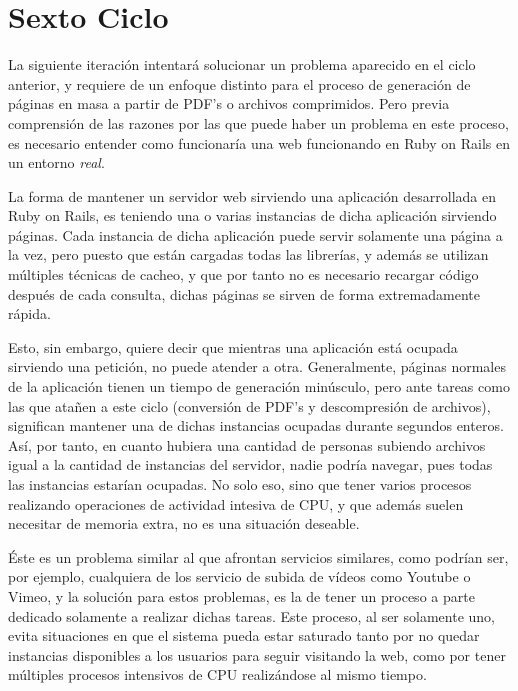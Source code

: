 \section{Sexto Ciclo} %
\label{sec:sexto_ciclo}

La siguiente iteración intentará solucionar un problema aparecido en el ciclo anterior, y requiere de un enfoque distinto para el proceso de generación de páginas en masa a partir de PDF's o archivos comprimidos. Pero previa comprensión de las razones por las que puede haber un problema en este proceso, es necesario entender como funcionaría una web funcionando en Ruby on Rails en un entorno \emph{real}.

La forma de mantener un servidor web sirviendo una aplicación desarrollada en Ruby on Rails, es teniendo una o varias instancias de dicha aplicación sirviendo páginas. Cada instancia de dicha aplicación puede servir solamente una página a la vez, pero puesto que están cargadas todas las librerías, y además se utilizan múltiples técnicas de cacheo, y que por tanto no es necesario recargar código después de cada consulta, dichas páginas se sirven de forma extremadamente rápida.

Esto, sin embargo, quiere decir que mientras una aplicación está ocupada sirviendo una petición, no puede atender a otra. Generalmente, páginas normales de la aplicación tienen un tiempo de generación minúsculo, pero ante tareas como las que atañen a este ciclo (conversión de PDF's y descompresión de archivos), significan mantener una de dichas instancias ocupadas durante segundos enteros. Así, por tanto, en cuanto hubiera una cantidad de personas subiendo archivos igual a la cantidad de instancias del servidor, nadie podría navegar, pues todas las instancias estarían ocupadas. No solo eso, sino que tener varios procesos realizando operaciones de actividad intesiva de CPU, y que además suelen necesitar de memoria extra, no es una situación deseable.

Éste es un problema similar al que afrontan servicios similares, como podrían ser, por ejemplo, cualquiera de los servicio de subida de vídeos como Youtube o Vimeo, y la solución para estos problemas, es la de tener un proceso a parte dedicado solamente a realizar dichas tareas. Este proceso, al ser solamente uno, evita situaciones en que el sistema pueda estar saturado tanto por no quedar instancias disponibles a los usuarios para seguir visitando la web, como por tener múltiples procesos intensivos de CPU realizándose al mismo tiempo.

